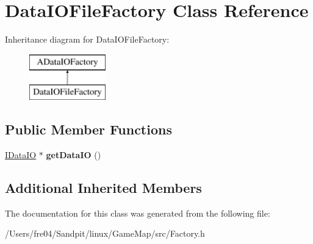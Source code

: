 \hypertarget{class_data_i_o_file_factory}{}\section{Data\+I\+O\+File\+Factory Class Reference}
\label{class_data_i_o_file_factory}
Inheritance diagram for Data\+I\+O\+File\+Factory\+:\begin{figure}[H]
\begin{center}
\leavevmode
\includegraphics[height=2.000000cm]{class_data_i_o_file_factory}
\end{center}
\end{figure}
\subsection*{Public Member Functions}
\begin{DoxyCompactItemize}
\item 
\hypertarget{class_data_i_o_file_factory_a14e669c5de957334704918994b172ec3}{}\hyperlink{class_i_data_i_o}{I\+Data\+I\+O} $\ast$ {\bfseries get\+Data\+I\+O} ()\label{class_data_i_o_file_factory_a14e669c5de957334704918994b172ec3}

\end{DoxyCompactItemize}
\subsection*{Additional Inherited Members}


The documentation for this class was generated from the following file\+:\begin{DoxyCompactItemize}
\item 
/\+Users/fre04/\+Sandpit/linux/\+Game\+Map/src/Factory.\+h\end{DoxyCompactItemize}
